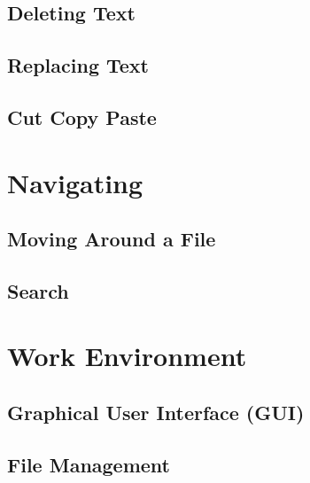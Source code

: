 \documentclass[12pt, oneside]{book}
\begin{document}
  \subsection{Deleting Text}
  \subsection{Replacing Text}
  \subsection{Cut Copy Paste}
\section{Navigating}
  \subsection{Moving Around a File}
  \subsection{Search}
\section{Work Environment}
  \subsection{Graphical User Interface (GUI)}
  \subsection{File Management}
\end{document}

